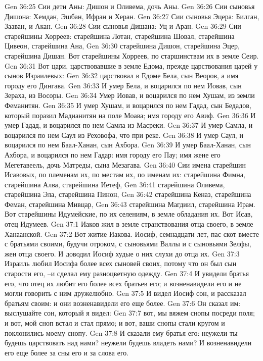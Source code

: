 Gen 36:25  Сии дети Аны: Дишон и Оливема, дочь Аны.
Gen 36:26  Сии сыновья Дишона: Хемдан, Эшбан, Ифран и Херан.
Gen 36:27  Сии сыновья Эцера: Билган, Зааван, и Акан.
Gen 36:28  Сии сыновья Дишана: Уц и Аран.
Gen 36:29  Сии старейшины Хорреев: старейшина Лотан, старейшина Шовал, старейшина Цивеон, старейшина Ана,
Gen 36:30  старейшина Дишон, старейшина Эцер, старейшина Дишан. Вот старейшины Хорреев, по старшинствам их в земле Сеир.
Gen 36:31  Вот цари, царствовавшие в земле Едома, прежде царствования царей у сынов Израилевых:
Gen 36:32  царствовал в Едоме Бела, сын Веоров, а имя городу его Дингава.
Gen 36:33  И умер Бела, и воцарился по нем Иовав, сын Зераха, из Восоры.
Gen 36:34  Умер Иовав, и воцарился по нем Хушам, из земли Феманитян.
Gen 36:35  И умер Хушам, и воцарился по нем Гадад, сын Бедадов, который поразил Мадианитян на поле Моава; имя городу его Авиф.
Gen 36:36  И умер Гадад, и воцарился по нем Самла из Масреки.
Gen 36:37  И умер Самла, и воцарился по нем Саул из Реховофа, что при реке.
Gen 36:38  И умер Саул, и воцарился по нем Баал-Ханан, сын Ахбора.
Gen 36:39  И умер Баал-Ханан, сын Ахбора, и воцарился по нем Гадар: имя городу его Пау; имя жене его Мегетавеель, дочь Матреды, сына Мезагава.
Gen 36:40  Сии имена старейшин Исавовых, по племенам их, по местам их, по именам их: старейшина Фимна, старейшина Алва, старейшина Иетеф,
Gen 36:41  старейшина Оливема, старейшина Эла, старейшина Пинон,
Gen 36:42  старейшина Кеназ, старейшина Феман, старейшина Мивцар,
Gen 36:43  старейшина Магдиил, старейшина Ирам. Вот старейшины Идумейские, по их селениям, в земле обладания их. Вот Исав, отец Идумеев.
Gen 37:1  Иаков жил в земле странствования отца своего, в земле Ханаанской.
Gen 37:2  Вот житие Иакова. Иосиф, семнадцати лет, пас скот вместе с братьями своими, будучи отроком, с сыновьями Валлы и с сыновьями Зелфы, жен отца своего. И доводил Иосиф худые о них слухи до отца их.
Gen 37:3  Израиль любил Иосифа более всех сыновей своих, потому что он был сын старости его, --и сделал ему разноцветную одежду.
Gen 37:4  И увидели братья его, что отец их любит его более всех братьев его; и возненавидели его и не могли говорить с ним дружелюбно.
Gen 37:5  И видел Иосиф сон, и рассказал братьям своим: и они возненавидели его еще более.
Gen 37:6  Он сказал им: выслушайте сон, который я видел:
Gen 37:7  вот, мы вяжем снопы посреди поля; и вот, мой сноп встал и стал прямо; и вот, ваши снопы стали кругом и поклонились моему снопу.
Gen 37:8  И сказали ему братья его: неужели ты будешь царствовать над нами? неужели будешь владеть нами? И возненавидели его еще более за сны его и за слова его.
